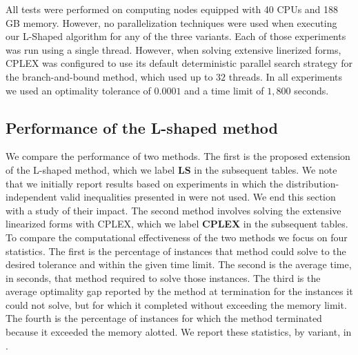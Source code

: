 \documentclass[12pt]{article}
\theoremstyle{thmstylethree}%
\begin{document}
All tests were performed on computing nodes equipped with 40 CPUs and 188 GB memory.
However, no parallelization techniques were used when executing our L-Shaped algorithm for any of the three variants.
Each of those experiments was run using a single thread. However, when solving extensive linerized forms, CPLEX was configured to use its default deterministic parallel search strategy for the branch-and-bound method, which used up to $32$ threads.
In all experiments we used an optimality tolerance of $0.0001$ and a time limit of $1,800$ seconds.



\subsection{Performance of the L-shaped method} \label{subsec:perf_benders}

We compare the performance of two methods. The first is the proposed extension of the L-shaped method, which we label \textbf{LS} in the subsequent tables. We note that we initially report results based on experiments in which the distribution-independent valid inequalities presented in  were not used. We end this section with a study of their impact.  The second method involves solving the extensive linearized forms with CPLEX, which we label \textbf{CPLEX} in the subsequent tables. To compare the computational effectiveness of the two methods we focus on four statistics. The first is the percentage of instances that method could solve to the desired tolerance and within the given time limit. The second is the average time, in seconds, that method required to solve those instances. The third is the average optimality gap reported by the method at termination for the instances it could not solve, but for which it completed without exceeding the memory limit. The fourth is the percentage of instances for which the method terminated because it exceeded the memory alotted.  We report these statistics, by variant, in .
\end{document}
